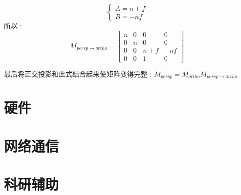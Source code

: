 \documentclass[UTF8]{ctexbook}
\begin{document}
{{{{\begin{itemize}
{\begin{itemize}
{$$                          \begin{cases}
                            A = n + f \\
                            B = -nf
                          \end{cases}
                        $$
                        所以 : $$
                          M_{persp \to ortho}
                          =
                          \left[\begin{matrix}
                              n & 0 & 0     & 0   \\
                              0 & n & 0     & 0   \\
                              0 & 0 & n + f & -nf \\
                              0 & 0 & 1     & 0
                            \end{matrix}\right]
                        $$

                        最后将正交投影和此式结合起来使矩阵变得完整 : $M_{persp} = M_{ortho}M_{persp \to ortho}$
                        }
                \end{itemize}
                }
        \end{itemize}


      }%

    }%

   }%

  \section{硬件}{

   }%

  \section{网络通信}{

   }%

  \section{科研辅助}{

   }%

 }%
\end{document}
